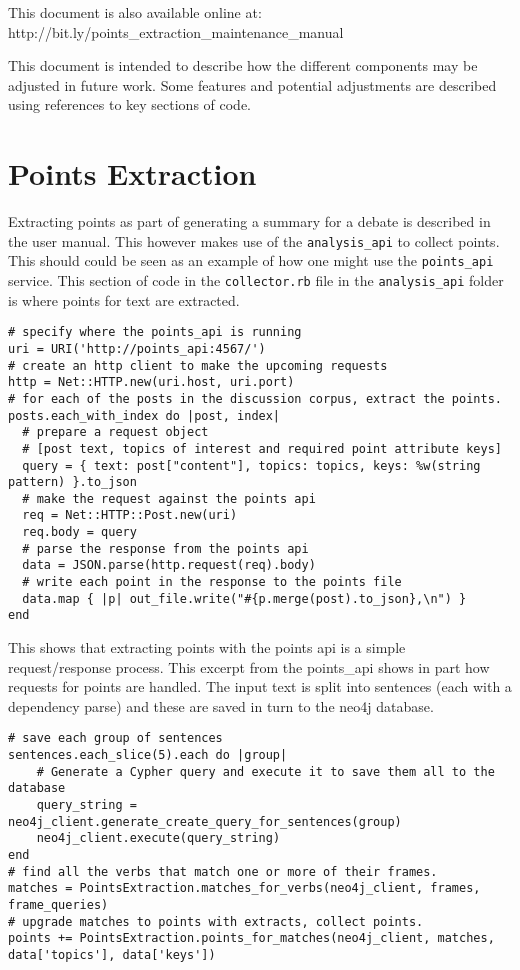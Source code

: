 This document is also available online at: \\ http://bit.ly/points\_extraction\_maintenance\_manual

\noindent\hrulefill

\noindent This document is intended to describe how the different components may
be adjusted in future work. Some features and potential adjustments are
described using references to key sections of code.

\section{Points Extraction}

Extracting points as part of generating a summary for a debate is
described in the user manual. This however makes use of the
\texttt{analysis\_api} to collect points. This should could be seen as
an example of how one might use the \texttt{points\_api} service. This
section of code in the \texttt{collector.rb} file in the
\texttt{analysis\_api} folder is where points for text are extracted.

\begin{verbatim}
# specify where the points_api is running
uri = URI('http://points_api:4567/')
# create an http client to make the upcoming requests
http = Net::HTTP.new(uri.host, uri.port)
# for each of the posts in the discussion corpus, extract the points.
posts.each_with_index do |post, index|
  # prepare a request object
  # [post text, topics of interest and required point attribute keys]
  query = { text: post["content"], topics: topics, keys: %w(string pattern) }.to_json
  # make the request against the points api
  req = Net::HTTP::Post.new(uri)
  req.body = query
  # parse the response from the points api
  data = JSON.parse(http.request(req).body)
  # write each point in the response to the points file
  data.map { |p| out_file.write("#{p.merge(post).to_json},\n") }
end
\end{verbatim}

This shows that extracting points with the points api is a simple
request/response process. This excerpt from the points\_api shows in
part how requests for points are handled. The input text is split into
sentences (each with a dependency parse) and these are saved in turn to
the neo4j database.

\begin{verbatim}
# save each group of sentences
sentences.each_slice(5).each do |group|
    # Generate a Cypher query and execute it to save them all to the database
    query_string = neo4j_client.generate_create_query_for_sentences(group)
    neo4j_client.execute(query_string)
end
# find all the verbs that match one or more of their frames.
matches = PointsExtraction.matches_for_verbs(neo4j_client, frames, frame_queries)
# upgrade matches to points with extracts, collect points.
points += PointsExtraction.points_for_matches(neo4j_client, matches, data['topics'], data['keys'])
\end{verbatim}

